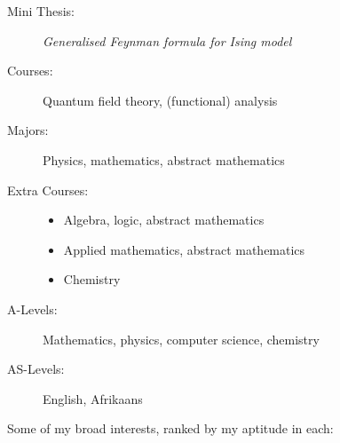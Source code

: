 \documentclass[10pt,a4paper,ragged2e,academicons]{altacv}
\begin{document}
\divider

\begin{description}
    \item[Mini Thesis:] \textit{Generalised Feynman formula for Ising model}
    \item[Courses:] Quantum field theory, (functional) analysis
\end{description}

\divider

\begin{description}
    \item[Majors:] Physics, mathematics, abstract mathematics
    \item[Extra Courses:] \quad
    \smallskip
    \begin{itemize}
        \item {} Algebra, logic, abstract mathematics
        \item {} Applied mathematics, abstract mathematics
        \item {} Chemistry
    \end{itemize}
\end{description}

\divider

\begin{description}
    \item[A-Levels:] Mathematics, physics, computer science, chemistry
    \item[AS-Levels:] English, Afrikaans
\end{description}





Some of my broad interests, ranked by my aptitude in each:\\
\vspace{3mm}
\smallskip
{}
\smallskip
{}
\smallskip
{}
\end{document}
